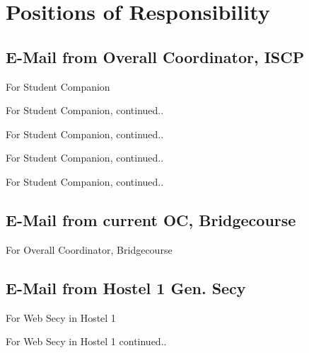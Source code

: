 \documentclass{article}
\begin{document}
\section{Positions of Responsibility}
	\subsection{E-Mail from Overall Coordinator, ISCP}
		For Student Companion
		\begin{figure}[h]
		\end{figure}
\newpage
		For Student Companion, continued..
		\begin{figure}[h]
		\end{figure}
\newpage
		For Student Companion, continued..
		\begin{figure}[h]
		\end{figure}
\newpage
		For Student Companion, continued..
		\begin{figure}[h]
		\end{figure}
\newpage
		For Student Companion, continued..
		\begin{figure}[h]
		\end{figure}
\newpage
	\subsection{E-Mail from current OC, Bridgecourse}
		For Overall Coordinator, Bridgecourse
		\begin{figure}[h]
		\end{figure}
\newpage
	\subsection{E-Mail from Hostel 1 Gen. Secy}
		For Web Secy in Hostel 1
		\begin{figure}[h]
		\end{figure}
\newpage
		\noindent For Web Secy in Hostel 1 continued..
		\begin{figure}[h]
		\end{figure}
\end{document}
